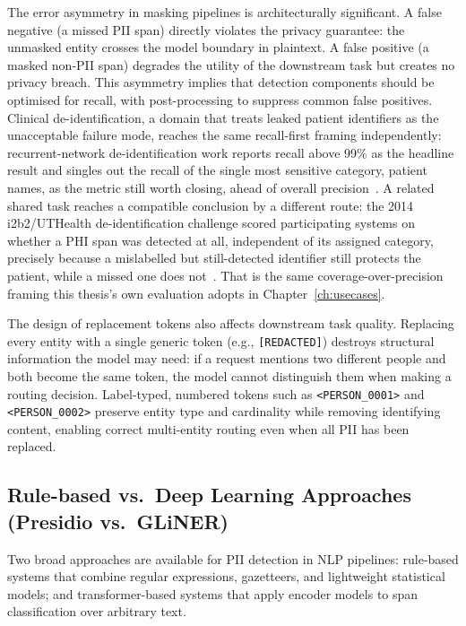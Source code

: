 The error asymmetry in masking pipelines is architecturally significant. A false negative (a missed PII span) directly violates the privacy guarantee: the unmasked entity crosses the model boundary in plaintext. A false positive (a masked non-PII span) degrades the utility of the downstream task but creates no privacy breach. This asymmetry implies that detection components should be optimised for recall, with post-processing to suppress common false positives. Clinical de-identification, a domain that treats leaked patient identifiers as the unacceptable failure mode, reaches the same recall-first framing independently: recurrent-network de-identification work reports recall above 99\% as the headline result and singles out the recall of the single most sensitive category, patient names, as the metric still worth closing, ahead of overall precision~\cite{dernoncourt2017deidentification}. A related shared task reaches a compatible conclusion by a different route: the 2014 i2b2/UTHealth de-identification challenge scored participating systems on whether a PHI span was detected at all, independent of its assigned category, precisely because a mislabelled but still-detected identifier still protects the patient, while a missed one does not~\cite{stubbs2015deidentification}. That is the same coverage-over-precision framing this thesis's own evaluation adopts in Chapter~\ref{ch:usecases}.

The design of replacement tokens also affects downstream task quality. Replacing every entity with a single generic token (e.g., \texttt{[REDACTED]}) destroys structural information the model may need: if a request mentions two different people and both become the same token, the model cannot distinguish them when making a routing decision. Label-typed, numbered tokens such as \texttt{<PERSON\_0001>} and \texttt{<PERSON\_0002>} preserve entity type and cardinality while removing identifying content, enabling correct multi-entity routing even when all PII has been replaced.

\subsection{Rule-based vs.\ Deep Learning Approaches (Presidio vs.\ GLiNER)}
\label{subsec:background_presidio_gliner}

Two broad approaches are available for PII detection in NLP pipelines: rule-based systems that combine regular expressions, gazetteers, and lightweight statistical models; and transformer-based systems that apply encoder models to span classification over arbitrary text.

